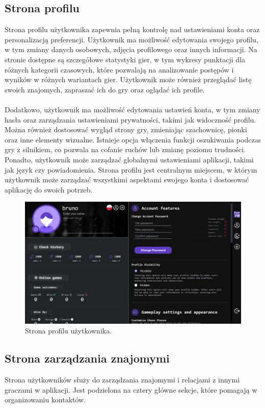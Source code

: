 \documentclass[12pt,a4paper]{article}
\begin{document}
\subsection{Strona profilu}
Strona profilu użytkownika zapewnia pełną kontrolę nad ustawieniami konta oraz personalizacją preferencji. Użytkownik ma możliwość edytowania swojego profilu, w tym zmiany danych osobowych, zdjęcia profilowego oraz innych informacji. Na stronie dostępne są szczegółowe statystyki gier, w tym wykresy punktacji dla różnych kategorii czasowych, które pozwalają na analizowanie postępów i wyników w różnych wariantach gier. Użytkownik może również przeglądać listę swoich znajomych, zapraszać ich do gry oraz oglądać ich profile.
\\\\
Dodatkowo, użytkownik ma możliwość edytowania ustawień konta, w tym zmiany hasła oraz zarządzania ustawieniami prywatności, takimi jak widoczność profilu. Można również dostosować wygląd strony gry, zmieniając szachownicę, pionki oraz inne elementy wizualne. Istnieje opcja włączenia funkcji oszukiwania podczas gry z silnikiem, co pozwala na cofanie ruchów lub zmianę poziomu trudności. Ponadto, użytkownik może zarządzać globalnymi ustawieniami aplikacji, takimi jak język czy powiadomienia. Strona profilu jest centralnym miejscem, w którym użytkownik może zarządzać wszystkimi aspektami swojego konta i dostosować aplikację do swoich potrzeb.

\begin{figure}[h!]
    \centering
    \includegraphics[width=1\textwidth]{zdj/ins_account.png}
    \caption{Strona profilu użytkownika.}
\end{figure}

\newpage
\subsection{Strona zarządzania znajomymi}
Strona użytkowników służy do zarządzania znajomymi i relacjami z innymi graczami w aplikacji. Jest podzielona na cztery główne sekcje, które pomagają w organizowaniu kontaktów.
\end{document}
